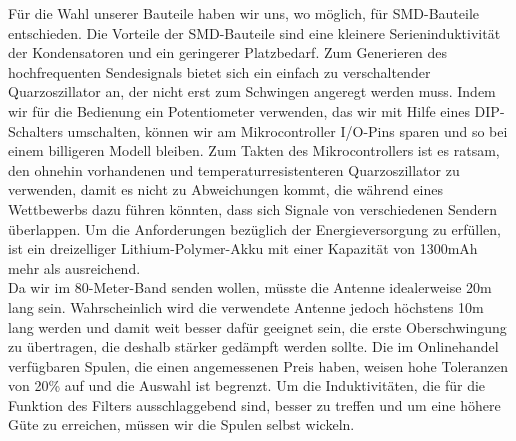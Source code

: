 Für die Wahl unserer Bauteile haben wir uns, wo möglich, für SMD-Bauteile entschieden. Die Vorteile der SMD-Bauteile sind eine kleinere Serieninduktivität der Kondensatoren und ein geringerer Platzbedarf.
Zum Generieren des hochfrequenten Sendesignals bietet sich ein einfach zu verschaltender Quarzoszillator an, der nicht erst zum Schwingen angeregt werden muss. 
Indem wir für die Bedienung ein Potentiometer verwenden, das wir mit Hilfe eines DIP-Schalters umschalten, können wir am Mikrocontroller I/O-Pins sparen und so bei einem billigeren Modell bleiben. Zum Takten des Mikrocontrollers ist es ratsam, den ohnehin vorhandenen und temperaturresistenteren Quarzoszillator zu verwenden, damit es nicht zu Abweichungen kommt, die während eines Wettbewerbs dazu führen könnten, dass sich Signale von verschiedenen Sendern überlappen. 
Um die Anforderungen bezüglich der Energieversorgung zu erfüllen, ist ein dreizelliger Lithium-Polymer-Akku mit einer Kapazität von 1300mAh mehr als ausreichend.\\
Da wir im 80-Meter-Band senden wollen, müsste die Antenne idealerweise 20m lang sein. Wahrscheinlich wird die verwendete Antenne jedoch höchstens 10m lang werden und damit weit besser dafür geeignet sein, die erste Oberschwingung zu übertragen, die deshalb stärker gedämpft werden sollte. Die im Onlinehandel verfügbaren Spulen, die einen angemessenen Preis haben, weisen hohe Toleranzen von 20\% auf und die Auswahl ist begrenzt. Um die Induktivitäten, die für die Funktion des Filters ausschlaggebend sind, besser zu treffen und um eine höhere Güte zu erreichen, müssen wir die Spulen selbst wickeln.

